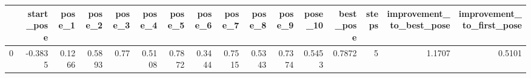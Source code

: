 \begin{tabular}{lrrrrrrrrrrrrrrr}
\toprule
{} &  start\_pose &  pose\_1 &  pose\_2 &  pose\_3 &  pose\_4 &  pose\_5 &  pose\_6 &  pose\_7 &  pose\_8 &  pose\_9 &  pose\_10 &  best\_pose &  steps &  improvement\_to\_best\_pose &  improvement\_to\_first\_pose \\
\midrule
0 &     -0.3835 &  0.1266 &  0.5893 &    0.77 &  0.5108 &  0.7872 &  0.3444 &  0.7515 &  0.5343 &  0.7374 &   0.5453 &     0.7872 &      5 &                    1.1707 &                     0.5101 \\
\bottomrule
\end{tabular}
